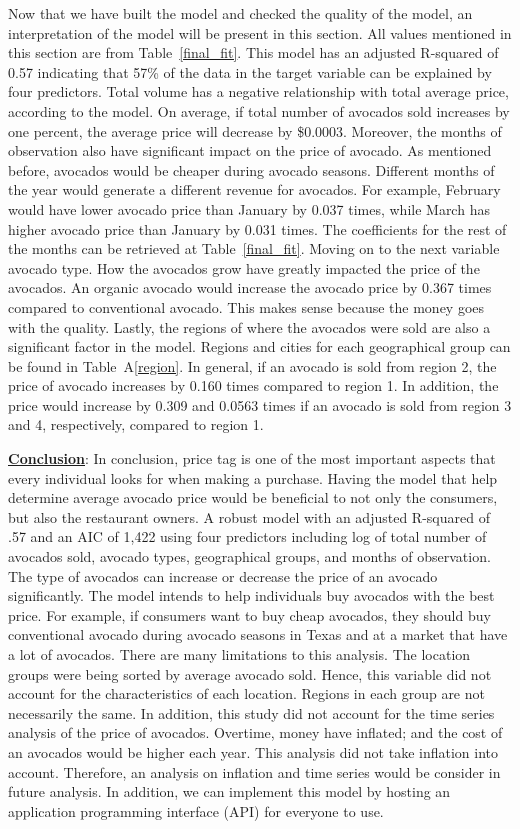 \documentclass[11pt]{article}\usepackage[]{graphicx}\usepackage[]{color}
\begin{document}
\noindent Now that we have built the model and checked the quality of the model, an interpretation of the model will be present in this section. All values mentioned in this section are from Table~\ref{final_fit}. This model has an adjusted R-squared of 0.57 indicating that 57\% of the data in the target variable can be explained by four predictors. Total volume has a negative relationship with total average price, according to the model. On average, if total number of avocados sold increases by one percent, the average price will decrease by \$0.0003. Moreover, the months of observation also have significant impact on the price of avocado. As mentioned before, avocados would be cheaper during avocado seasons. Different months of the year would generate a different revenue for avocados. For example, February would have lower avocado price than January by 0.037 times, while March has higher avocado price than January by 0.031 times. The coefficients for the rest of the months can be retrieved at Table~\ref{final_fit}. Moving on to the next variable avocado type. How the avocados grow have greatly impacted the price of the avocados. An organic avocado would increase the avocado price by 0.367 times compared to conventional avocado. This makes sense because the money goes with the quality. Lastly, the regions of where the avocados were sold are also a significant factor in the model. Regions and cities for each geographical group can be found in Table~A\ref{region}. In general, if an avocado is sold from region 2, the price of avocado increases by 0.160 times compared to region 1. In addition, the price would increase by 0.309 and 0.0563 times if an avocado is sold from region 3 and 4, respectively, compared to region 1.
\hfill \break


\noindent\textbf{\underline{Conclusion}}: In conclusion, price tag is one of the most important aspects that every individual looks for when making a purchase. Having the model that help determine average avocado price would be beneficial to not only the consumers, but also the restaurant owners. A robust model with an adjusted R-squared of .57 and an AIC of 1,422 using four predictors including log of total number of avocados sold, avocado types, geographical groups, and months of observation. The type of avocados can increase or decrease the price of an avocado significantly. The model intends to help individuals buy avocados with the best price. For example, if consumers want to buy cheap avocados, they should buy conventional avocado during avocado seasons in Texas and at a market that have a lot of avocados. There are many limitations to this analysis. The location groups were being sorted by average avocado sold. Hence, this variable did not account for the characteristics of each location. Regions in each group are not necessarily the same. In addition, this study did not account for the time series analysis of the price of avocados. Overtime, money have inflated; and the cost of an avocados would be higher each year. This analysis did not take inflation into account. Therefore, an analysis on inflation and time series would be consider in future analysis. In addition, we can implement this model by hosting an application programming interface (API) for everyone to use.
\hfill \break
\end{document}
